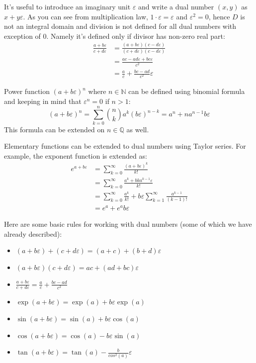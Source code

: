 \documentclass[reprint,amsmath,amssymb,aps,pre,showkeys,showpacs]{revtex4-1}
\begin{document}
It's useful to introduce an imaginary unit $\varepsilon$ and write a dual number
$(x, y)$ as $x + y\varepsilon$. As you can see from multiplication law,
$1\cdot \varepsilon = \varepsilon$ and $\varepsilon^2 = 0$, hence $D$ is not an
integral domain and division is not defined for all dual numbers with exception
of $0$. Namely it's defined only if divisor has non-zero real part:
\begin{align*}
  \frac{a+b\varepsilon}{c+d\varepsilon} &=
  \frac{(a+b\varepsilon)(c-d\varepsilon)}{(c+d\varepsilon)(c-d\varepsilon)} \\
  &= \frac{ac-ad\varepsilon+bc\varepsilon}{c^2} \\
  &= \frac{a}{c} + \frac{bc-ad}{c^2}\varepsilon
\end{align*}

Power function $(a + b\varepsilon)^n$ where $n \in \mathbb{N}$ can be defined
using binomial formula and keeping in mind that $\varepsilon^n = 0$ if $n>1$:
\begin{equation*}
  (a + b\varepsilon)^n = \sum_{k=0}^n \binom{n}{k} a^k (b\varepsilon)^{n-k} =
  a^n + n a^{n-1} b \varepsilon
\end{equation*}
This formula can be extended on $n \in \mathbb{Q}$ as well.

Elementary functions can be extended to dual numbers using Taylor series. For
example, the exponent function is extended as:
\begin{align*}
  e^{a + b\varepsilon} &= \sum_{k=0}^{\infty}\frac{(a + b\varepsilon)^k}{k!} \\
  &= \sum_{k=0}^{\infty} \frac{a^k + bka^{k-1}\varepsilon}{k!} \\
  &= \sum_{k=0}^{\infty} \frac{a^k}{k!} + b\varepsilon \sum_{k=1}^{\infty}
  \frac{a^{k-1}}{(k-1)!} \\
  &= e^a + e^ab\varepsilon
\end{align*}

Here are some basic rules for working with dual numbers (some of which we have
already described):
\begin{itemize}
\item $(a + b\varepsilon) + (c + d\varepsilon) = (a + c) + (b + d)\varepsilon$
\item $(a + b\varepsilon) (c + d\varepsilon) = ac + (ad + bc)\varepsilon$
\item $\frac{a + b\varepsilon}{c + d\varepsilon} = \frac{a}{c} + \frac{bc - ad}{c^2}$
\item $\exp(a + b\varepsilon) = \exp(a) + b\varepsilon\exp(a)$
\item $\sin(a + b\varepsilon) = \sin(a) + b\varepsilon\cos(a)$
\item $\cos(a + b\varepsilon) = \cos(a) - b\varepsilon\sin(a)$
\item $\tan(a + b\varepsilon) = \tan(a) - \frac{b}{cos^2(a)}\varepsilon$
\end{itemize}
\end{document}
